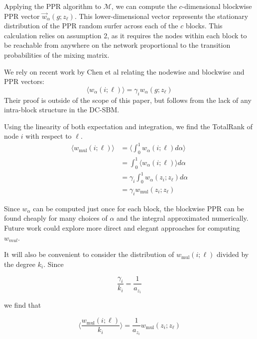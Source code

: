 \documentclass[12pt]{article}
\begin{document}
Applying the PPR algorithm to $\mathcal{M}$, we can compute the $c$-dimensional blockwise PPR vector $\vec{w}_\alpha(g; z_\ell)$.  This lower-dimensional vector represents the stationary distribution of the PPR random surfer across each of the $c$ blocks.  This calculation relies on assumption 2, as it requires the nodes within each block to be reachable from anywhere on the network proportional to the transition probabilities of the mixing matrix.

We rely on recent work by Chen et al \cite{chen:2020} relating the nodewise and blockwise and PPR vectors:
\begin{equation}
  \langle w_\alpha (i ; \ell) \rangle = \gamma_i w_\alpha(g; z_\ell)
\end{equation}
Their proof is outside of the scope of this paper, but follows from the lack of any intra-block structure in the DC-SBM.

Using the linearity of both expectation and integration, we find the TotalRank \cite{boldi:2005} \cite{Peel:2018} of node $i$ with respect to $\ell$.
\begin{equation}
  \begin{aligned}
    \langle w_\text{mul} (i ; \ell) \rangle &= \big \langle \int_0^1 w_\alpha(i; \ell) d\alpha \big \rangle \\
    &= \int_0^1 \langle w_\alpha(i; \ell) \rangle d\alpha \\
    &= \gamma_i \int_0^1 w_\alpha(z_i; z_\ell) d\alpha \\
    &= \gamma_i w_\text{mul}(z_i;z_\ell)
  \end{aligned}
\end{equation}

Since $w_\alpha$ can be computed just once for each block, the blockwise PPR can be found cheaply for many choices of $\alpha$ and the integral approximated numerically.  Future work could explore more direct and elegant approaches for computing $w_{mul}$. 

It will also be convenient to consider the distribution of $w_\text{mul}(i;\ell)$ divided by the degree $k_i$.  Since

\begin{equation}
  \frac{\gamma_i}{k_i} = \frac{1}{a_{z_i}}
\end{equation}

we find that 

\begin{equation}
  \big \langle \frac{w_\text{mul}(i;\ell)}{k_i} \big \rangle = \frac{1}{a_{z_i}} w_\text{mul}(z_i ;z_\ell)
\end{equation}
\end{document}
